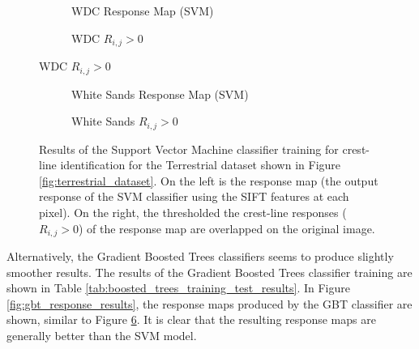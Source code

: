 \begin{figure}[H]
	\ContinuedFloat
	\centering
	\begin{subfigure}{0.48\textwidth}
		\centering
		\caption{WDC Response Map (SVM)}
		\label{fig:WDC_SVM_response}
	\end{subfigure}
	\begin{subfigure}{0.48\textwidth}
		\centering
		\caption{ WDC $R_{i,j} > 0$}
		\label{fig:WDC_SVM_response_overlay}
	\end{subfigure}
\end{figure}
\begin{figure}[H]
	\ContinuedFloat
	\centering
	\begin{subfigure}{0.48\textwidth}
		\centering
		\caption{White Sands Response Map (SVM)}
		\label{fig:WhiteSands_SVM_response}
	\end{subfigure}
	\begin{subfigure}{0.48\textwidth}
		\centering
		\caption{ White Sands $R_{i,j} > 0$}
		\label{fig:WhiteSands_SVM_response_overlay}
	\end{subfigure}
	\caption{Results of the Support Vector Machine classifier training for crest-line identification for the Terrestrial dataset shown in Figure \ref{fig:terrestrial_dataset}. On the left is the response map (the output response of the SVM classifier using the SIFT features at each pixel). On the right, the thresholded the crest-line responses ($R_{i,j} > 0$) of the response map are overlapped on the original image. }
	\label{fig:SVM_response_results}
\end{figure}

Alternatively, the Gradient Boosted Trees classifiers seems to produce slightly smoother results. The results of the Gradient Boosted Trees classifier training are shown in Table \ref{tab:boosted_trees_training_test_results}. In Figure \ref{fig:gbt_response_results}, the response maps produced by the GBT classifier are shown, similar to Figure \ref{fig:SVM_response_results}. It is clear that the resulting response maps are generally better than the SVM model.

